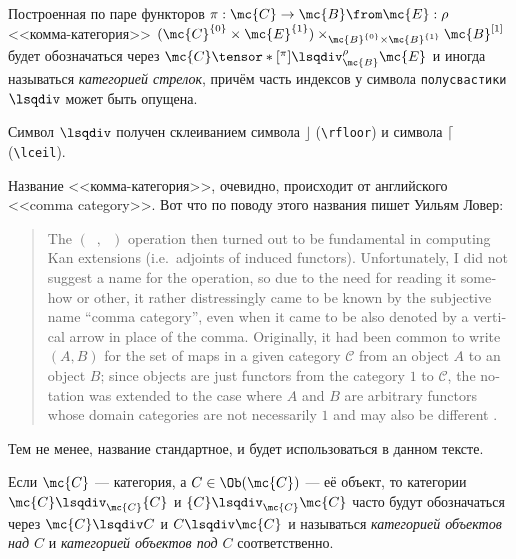 \documentclass[
	extrafontsizes,
	11pt,
	hyphens,
]{memoir}
\begin{document}
\begin{convention}
Построенная по паре функторов \(\pi : \mc{C} \to \mc{B} \from \mc{E} : \rho\) <<комма-категория>>
\((\mc{C}^{\{0\}} \times \mc{E}^{\{1\}}) \times_{\mc{B}^{\{0\}} \times \mc{B}^{\{1\}}} \mc{B}^{[1]}\)
будет обозначаться через \(\mc{C} \tensor*[^\pi]{\lsqdiv}{^\rho_{\mc{B}}} \mc{E}\) и иногда называться \emph{категорией стрелок}, причём часть индексов у символа \texttt{полусвастики} \(\lsqdiv\) может быть опущена.
\end{convention}

\begin{remark}
Символ \(\lsqdiv\) получен склеиванием символа \(\rfloor\) (\texttt{\textbackslash{}rfloor}) и символа \(\lceil\) (\texttt{\textbackslash{}lceil}).
\end{remark}

\begin{remark}
Название <<комма-категория>>, очевидно, происходит от английского <<\textenglish{comma category}>>.
Вот что по поводу этого названия пишет Уильям Ловер:
\begin{quote}
\textenglish{%
The \((\phantom{x}, \phantom{x})\) operation then turned out to be fundamental in computing Kan extensions (i.e.\ adjoints of induced functors). Unfortunately, I did not suggest a name for the operation, so due to the need for reading it somehow or other, it rather distressingly came to be known by the subjective name ``comma category'', even when it came to be also denoted by a vertical arrow in place of the comma. Originally, it had been common to write \((A, B)\) for the set of maps in a given category \(\mathcal{C}\) from an object \(A\) to an object \(B\); since objects are just functors from the category \(1\) to \(\mathcal{C}\), the notation was extended to the case where \(A\) and \(B\) are arbitrary functors whose domain categories are not necessarily \(1\) and may also be different \autocite[13]{Lawvere_Thesis_Reprint}.}
\end{quote}
Тем не менее, название стандартное, и будет использоваться в данном тексте.
\end{remark}

\begin{convention}
\label{conv:ObjOverUnder}
Если \(\mc{C}\) --- категория, а \(C \in \Ob(\mc{C})\) --- её объект,
то категории \(\mc{C} \lsqdiv_{\mc{C}} \{C\}\) и \(\{C\} \lsqdiv_{\mc{C}} \mc{C}\) часто будут обозначаться через \(\mc{C} \lsqdiv C\) и \(C \lsqdiv \mc{C}\)
и называться \emph{категорией объектов над \(C\)} и \emph{категорией объектов под \(C\)} соответственно.
\end{convention}
\end{document}
